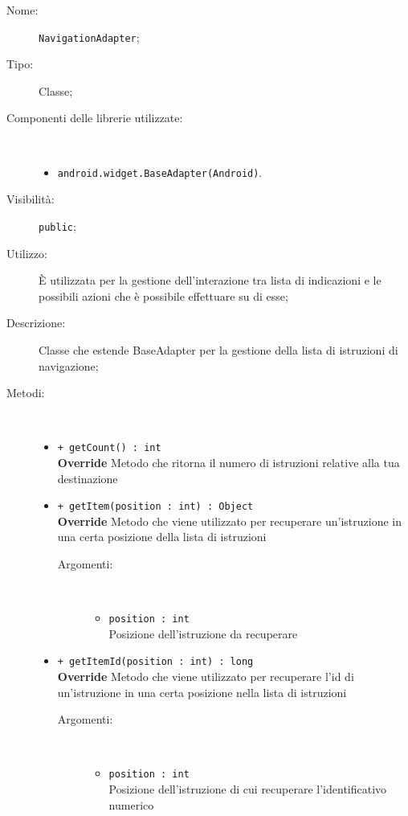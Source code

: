 \documentclass[../DefinizioneDiProdotto.tex]{subfiles}
\begin{document}
    \begin{description}
\item[Nome:] \texttt{NavigationAdapter};
\item[Tipo:] Classe;
\item[Componenti delle librerie utilizzate:] \
\begin{itemize}
\item \texttt{android.widget.BaseAdapter(Android)}.

\end{itemize}
\item[Visibilità:] \texttt{public};
\item[Utilizzo:] È utilizzata per la gestione dell'interazione tra lista di indicazioni e le possibili azioni che è possibile effettuare su di esse;
\item[Descrizione:] Classe che estende BaseAdapter per la gestione della lista di istruzioni di navigazione;
\item[Metodi:] \
\begin{itemize}
\item \texttt{+ getCount() : int}\\
\textbf{Override} Metodo che ritorna il numero di istruzioni relative alla tua destinazione
 \item \texttt{+ getItem(position : int) : Object}\\
\textbf{Override} Metodo che viene utilizzato per recuperare un'istruzione in una certa posizione della lista di istruzioni
 \begin{description}
\item[Argomenti:] \
\begin{itemize}
\item \texttt{position : int}\\
Posizione dell'istruzione da recuperare\end{itemize}
\end{description}
\item \texttt{+ getItemId(position : int) : long}\\
\textbf{Override} Metodo che viene utilizzato per recuperare l'id di un'istruzione in una certa posizione nella lista di istruzioni
 \begin{description}
\item[Argomenti:] \
\begin{itemize}
\item \texttt{position : int}\\
Posizione dell'istruzione di cui recuperare l'identificativo numerico\end{itemize}

\end{description}
\end{itemize}
\end{description}
\end{document}
